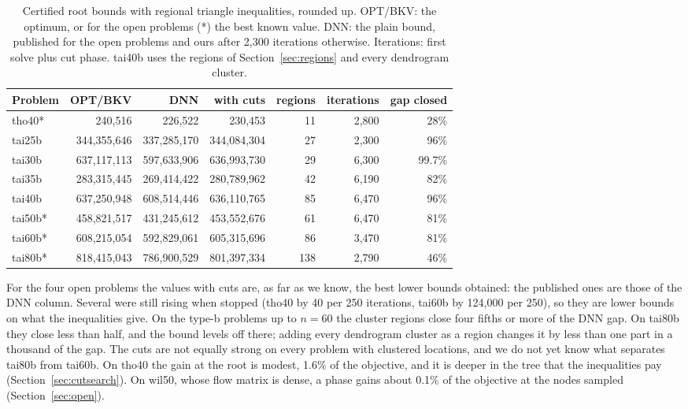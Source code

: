\documentclass[10pt]{article}
\theoremstyle{remark}
\begin{document}
\begin{table}[t]\centering
\caption{Certified root bounds with regional triangle inequalities, rounded up.
OPT/BKV: the optimum, or for the open problems (*) the best known value. DNN: the
plain bound, published \cite{graham,kkt} for the open problems and ours after 2,300
iterations otherwise. Iterations: first solve plus cut phase. tai40b uses the
regions of Section~\ref{sec:regions} and every dendrogram cluster.}\label{tab:cutbounds}
\small\setlength{\tabcolsep}{3.5pt}
\begin{tabular}{lrrrrrr}
\toprule
Problem & OPT/BKV & DNN & with cuts & regions & iterations & gap closed\\
\midrule
tho40* & 240,516 & 226,522 & 230,453 & 11 & 2,800 & 28\%\\
\midrule
tai25b & 344,355,646 & 337,285,170 & 344,084,304 & 27 & 2,300 & 96\%\\
tai30b & 637,117,113 & 597,633,906 & 636,993,730 & 29 & 6,300 & 99.7\%\\
tai35b & 283,315,445 & 269,414,422 & 280,789,962 & 42 & 6,190 & 82\%\\
tai40b & 637,250,948 & 608,514,446 & 636,110,765 & 85 & 6,470 & 96\%\\
tai50b* & 458,821,517 & 431,245,612 & 453,552,676 & 61 & 6,470 & 81\%\\
tai60b* & 608,215,054 & 592,829,061 & 605,315,696 & 86 & 3,470 & 81\%\\
tai80b* & 818,415,043 & 786,900,529 & 801,397,334 & 138 & 2,790 & 46\%\\
\bottomrule
\end{tabular}
\end{table}

For the four open problems the values with cuts are, as far as we know, the best
lower bounds obtained: the published ones are those of the DNN column. Several were
still rising when stopped (tho40 by 40 per 250 iterations, tai60b by 124,000 per
250), so they are lower bounds on what the inequalities give. On the type-b problems
up to $n=60$ the cluster regions close four fifths or more of the DNN gap. On tai80b
they close less than half, and the bound levels off there; adding every dendrogram
cluster as a region changes it by less than one part in a thousand of the gap. The
cuts are not equally strong on every problem with clustered locations, and we do
not yet know what separates tai80b from tai60b. On tho40 the gain at the root is
modest, 1.6\% of the objective, and it is deeper in the tree that the inequalities
pay (Section~\ref{sec:cutsearch}). On wil50, whose flow matrix is dense, a phase gains about 0.1\% of the objective
at the nodes sampled (Section~\ref{sec:open}).
\end{document}
